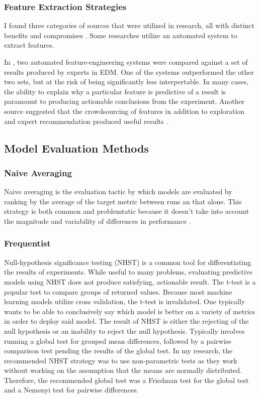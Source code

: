 \documentclass{article}
\begin{document}
        \subsubsection{Feature Extraction Strategies}
            I found three categories of sources that were utilized in research, all with distinct benefits and compromises \cite{automl2021,towards2014}.
            Some researches utilize an automated system to extract features.
            
            In \cite{automl2021}, two automated feature-engineering systems were compared against a set of results produced by experts in EDM.
            One of the systems outperformed the other two sets, but at the risk of being significantly less interpertable.
            In many cases, the ability to explain why a particular feature is predictive of a result is paramount to producing actionable conclusions from the experiment.
            Another source suggested that the crowdsourcing of features in addition to exploration and expert recommendation produced useful results \cite{towards2014}.
                
    \subsection{Model Evaluation Methods}
        \subsubsection{Naive Averaging}
            Naive averaging is the evaluation tactic by which models are evaluated by ranking by the average of the target metric between runs an that alone. 
            This strategy is both common and problemtatic because it doesn't take into account the magnitude and variability of differences in performance \cite{eval2018}.

        \subsubsection{Frequentist}
            Null-hypothesis significance testing (NHST) is a common tool for differentiating the results of experiments.
            While useful to many problems, evaluating predictive models using NHST does not produce satisfying, actionable result.
            The t-test is a popular test to compare groups of returned values. 
            Because most machine learning models utilize cross validation, the t-test is invalidated.
            One typically wants to be able to conclusively say which model is better on a variety of metrics in order to deploy said model.
            The result of NHST is either the rejecting of the null hypothesis or an inability to reject the null hypothesis.
            Typically involves running a global test for grouped mean differences, followed by a pairwise comparison test pending the results of the global test.
            In my research, the recommended NHST strategy was to use non-parametric tests as they work without working on the assumption that the means are normally distributed. 
            Therefore, the recommended global test was a Friedman test for the global test and a Nemenyi test for pairwise differences.
        
\end{document}
